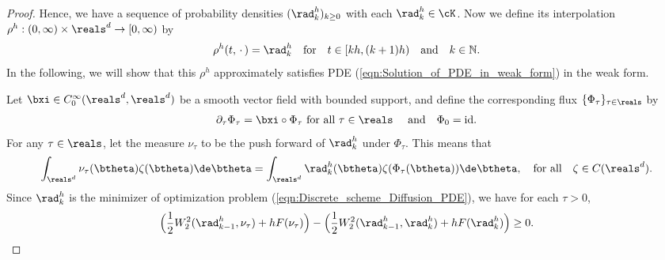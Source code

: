 \documentclass[11pt]{article}
\begin{document}
\begin{proof}
Hence, we have a sequence of probability densities $(\rad_k^{h})_{k \ge 0}$ with each $\rad_k^{h} \in \cK$. Now we define its interpolation $\rho^h: (0, \infty) \times \reals^d \to [0, \infty)$ by 
\[
\begin{aligned}
\rho^h(t,\,\cdot\,) = \rad_k^{h} ~~ \text{ for } ~~ t \in [k h, (k+1) h) ~~ \text{ and } ~~ k \in \mathbb N. 
\end{aligned}
\]
In the following, we will show that this $\rho^h$ approximately satisfies PDE (\ref{eqn:Solution_of_PDE_in_weak_form}) in the weak form. 

Let $\bxi \in C_0^\infty(\reals^d, \reals^d)$ be a smooth vector field with bounded support, and define the corresponding flux $\{\Phi_\tau \}_{\tau \in \reals}$ by 
\begin{align}
\partial_\tau \Phi_\tau = \bxi \circ \Phi_\tau \text{ for all } \tau \in \reals ~~~ \text{ and } ~~ \Phi_0 = {\rm id}. 
\end{align}
For any $\tau \in \reals$, let the measure $\nu_\tau$ to be the push forward of $\rad_k^h$ under $\Phi_\tau$. This means that
\begin{align}
\int_{\reals^d} \nu_\tau(\btheta) \zeta(\btheta) \de \btheta = \int_{\reals^d} \rad_k^h(\btheta) \zeta(\Phi_\tau(\btheta)) \de \btheta, ~~ \text{ for all } ~~ \zeta \in C(\reals^d). 
\end{align}
Since $\rad_k^h$ is the minimizer of optimization problem (\ref{eqn:Discrete_scheme_Diffusion_PDE}), we have for each $\tau > 0$, 
\begin{align}
\Big(\frac{1}{2} W_2^2(\rad_{k-1}^h, \nu_\tau) + h F(\nu_\tau) \Big) - \Big(\frac{1}{2} W_2^2(\rad_{k-1}^h, \rad_k^h) + h F(\rad_k^h)\Big) \ge 0. 
\end{align}


\end{proof}
\end{document}
